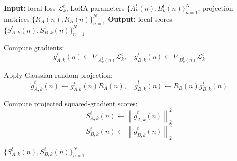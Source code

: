 \begin{algorithm}[h]
\caption{Score Computation $\mathcal{S}_{\|{g}\|^2}(\cdot)$ with Random Projection}
\label{alg:score_gnorm_rp}
\begin{algorithmic}[1]

\STATE \textbf{Input:} local loss $\mathcal{L}_k^t$, LoRA parameters $\{A_k^t(n), B_k^t(n)\}_{n=1}^{N}$, projection matrices $\{R_A(n), R_B(n)\}_{n=1}^{N}$
\STATE \textbf{Output:} local scores $\{S_{A,k}^t(n), S_{B,k}^t(n)\}_{n=1}^{N}$

    \STATE Compute gradients:
    \[
    g_{A,k}^t(n) \leftarrow \nabla_{A_k^t(n)} \mathcal{L}_k^t,
    \quad
    g_{B,k}^t(n) \leftarrow \nabla_{B_k^t(n)} \mathcal{L}_k^t
    \]

    \STATE Apply Gaussian random projection:
    \[
    \widetilde{g}_{A,k}^t(n) \leftarrow g_{A,k}^t(n) R_A(n),
    \quad
    \widetilde{g}_{B,k}^t(n) \leftarrow R_B(n) g_{B,k}^t(n)
    \]

    \STATE Compute projected squared-gradient scores:
    \[
    S_{A,k}^t(n) \leftarrow \left\|\widetilde{g}_{A,k}^t(n)\right\|_2^2
    \]
    \[
    S_{B,k}^t(n) \leftarrow \left\|\widetilde{g}_{B,k}^t(n)\right\|_2^2
    \]
\ENDFOR

\RETURN $\{S_{A,k}^t(n), S_{B,k}^t(n)\}_{n=1}^{N}$

\end{algorithmic}
\end{algorithm}

